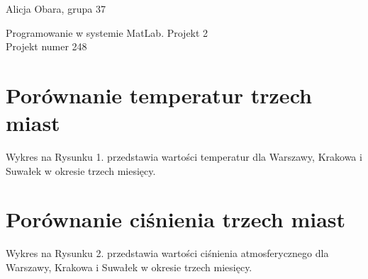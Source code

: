 \documentclass[a4paper]{article}
\begin{document}
	
\pagestyle{plain}
{\raggedright Alicja Obara, grupa 37 \\}
{\centering \Large Programowanie w systemie MatLab. Projekt 2\\Projekt numer 248 \\}


\section{Porównanie temperatur trzech miast}
Wykres na Rysunku 1. przedstawia wartości temperatur dla Warszawy, Krakowa i Suwałek w okresie trzech miesięcy.


\section{Porównanie ciśnienia trzech miast}
Wykres na Rysunku 2. przedstawia wartości ciśnienia atmosferycznego dla Warszawy, Krakowa i Suwałek w okresie trzech miesięcy.
\end{document}
